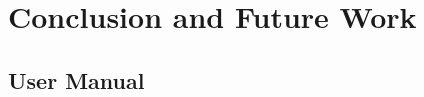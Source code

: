 \documentclass[12pt]{report}
\begin{document}
\chapter{Conclusion and Future Work}
\newpage



\newpage

\begin{appendices}

\chapter{User Manual}

\end{appendices}
\end{document}
